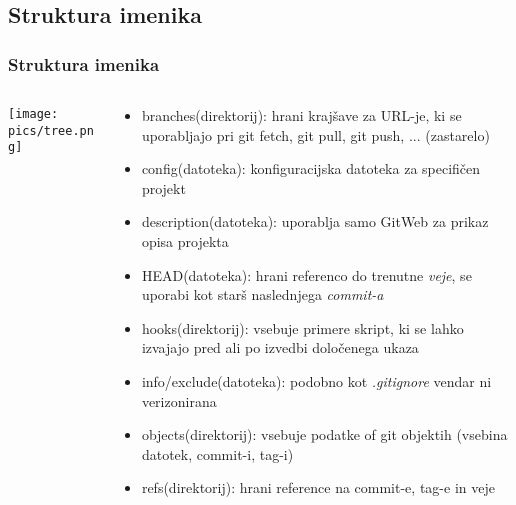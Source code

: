 \documentclass{beamer}
\begin{document}
\subsection{Struktura imenika}
\begin{frame}[shrink=28]
  \frametitle{Struktura imenika}
  \begin{columns}[c]
    \begin{column}{.5\textwidth}
      \texttt{[image: pics/tree.png]}
    \end{column}
    \begin{column}{.5\textwidth}
      \begin{itemize}
        \item branches(direktorij): hrani krajšave za URL-je, ki se uporabljajo
          pri git fetch, git pull, git push, ... (zastarelo)
        \item config(datoteka): konfiguracijska datoteka za specifičen projekt
        \item description(datoteka): uporablja samo GitWeb za prikaz opisa projekta
        \item HEAD(datoteka): hrani referenco do trenutne \emph{veje}, se
          uporabi kot starš naslednjega \emph{commit-a}
        \item hooks(direktorij): vsebuje primere skript, ki se lahko izvajajo
          pred ali po izvedbi določenega ukaza
        \item info/exclude(datoteka): podobno kot \emph{.gitignore} vendar ni verizonirana
        \item objects(direktorij): vsebuje podatke of git objektih (vsebina
          datotek, commit-i, tag-i)
        \item refs(direktorij): hrani reference na commit-e, tag-e in veje
      \end{itemize}
    \end{column}
  \end{columns}
\end{frame}
\end{document}
